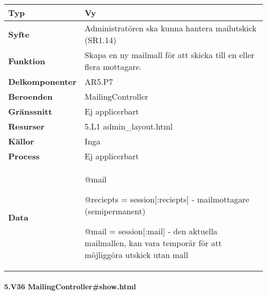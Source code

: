 \documentclass[a4paper, twoside, 11pt, titlepage]{article}
\begin{document}
			\begin {table} [ht] \begin{tabular} {  p{3.5cm} p{11.6cm} }
				\hline
				{\sffamily\textbf{Typ}} & {Vy} \\
				\hline
				{\sffamily\textbf{Syfte}} & {Administratören ska kunna hantera mailutskick (SR1.14)} \\
				\hline
				{\sffamily\textbf{Funktion}} & {Skapa en ny mailmall för att skicka till en eller flera mottagare.} \\
				\hline
				{\sffamily\textbf{Delkomponenter}} & {AR5.P7} \\
				\hline
				{\sffamily\textbf{Beroenden}} & {MailingController} \\
				\hline
				{\sffamily\textbf{Gränssnitt}} & {Ej applicerbart} \\
				\hline
				{\sffamily\textbf{Resurser}} & {5.L1 admin\_layout.html} \\
				\hline
				{\sffamily\textbf{Källor}} & {Inga} \\
				\hline
				{\sffamily\textbf{Process}} & {Ej applicerbart} \\
				\hline
				{\sffamily\textbf{Data}} & {@mail

@reciepts = session[:reciepts] - mailmottagare (semipermanent)

@mail = session[:mail] - den aktuella mailmallen, kan vara temporär för att möjliggöra utskick utan mall} \\
				\hline
			\end{tabular} \end{table} \FloatBarrier


			\paragraph{5.V36 MailingController\#show.html}\
\end{document}
